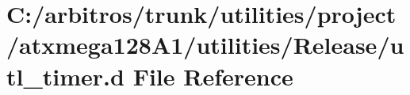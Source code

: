 \hypertarget{utilities_2project_2atxmega128_a1_2utilities_2_release_2utl__timer_8d}{\section{C\-:/arbitros/trunk/utilities/project/atxmega128\-A1/utilities/\-Release/utl\-\_\-timer.d File Reference}
\label{utilities_2project_2atxmega128_a1_2utilities_2_release_2utl__timer_8d}
}
